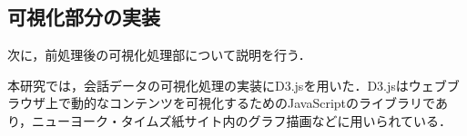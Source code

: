 \documentclass[shuuron]{kuee}
\begin{document}





\subsection{可視化部分の実装} %

次に，前処理後の可視化処理部について説明を行う．





本研究では，会話データの可視化処理の実装にD3.js\cite{vand3}を用いた．D3.jsはウェブブラウザ上で動的なコンテンツを可視化するためのJavaScriptのライブラリであり，ニューヨーク・タイムズ紙サイト内のグラフ描画などに用いられている．
\end{document}

